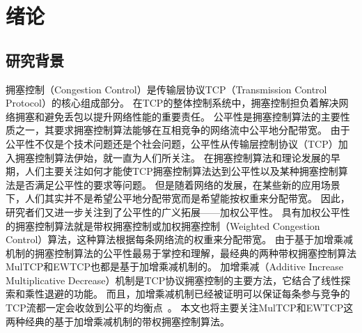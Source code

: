 \documentclass[winfonts]{njuthesis}
\begin{document}
\tableofcontents



\mainmatter

\chapter{绪论}\label{chapter:intro}
\section{研究背景}
拥塞控制（Congestion Control）是传输层协议TCP（Transmission Control Protocol）的核心组成部分。
在TCP的整体控制系统中，拥塞控制担负着解决网络拥塞和避免丢包以提升网络性能的重要责任\cite{jacobson1988congestion}。
公平性是拥塞控制算法的主要性质之一，其要求拥塞控制算法能够在互相竞争的网络流中公平地分配带宽。
由于公平性不仅是个技术问题还是个社会问题，公平性从传输层控制协议（TCP）加入拥塞控制算法伊始，就一直为人们所关注。
在拥塞控制算法和理论发展的早期，人们主要关注如何才能使TCP拥塞控制算法达到公平性以及某种拥塞控制算法是否满足公平性的要求等问题\cite{chiu1989analysis}\cite{kelly1998rate}\cite{hasegawa1999fairness}。
但是随着网络的发展，在某些新的应用场景\cite{wischik2011design}\cite{Nathan2019wcubic}下，人们其实并不是希望公平地分配带宽而是希望能按权重来分配带宽。
因此，研究者们又进一步关注到了公平性的广义拓展——加权公平性。
具有加权公平性的拥塞控制算法就是带权拥塞控制或加权拥塞控制（Weighted Congestion Control）算法，这种算法根据每条网络流的权重来分配带宽。
由于基于加增乘减机制的拥塞控制算法的公平性最易于掌控和理解，最经典的两种带权拥塞控制算法MulTCP\cite{crowcroft1998differentiated}和EWTCP\cite{wischik2011design}也都是基于加增乘减机制的。
加增乘减（Additive Increase Multiplicative Decrease）机制是TCP协议拥塞控制的主要方法，它结合了线性探索和乘性退避的功能。
而且，加增乘减机制已经被证明可以保证每条参与竞争的TCP流都一定会收敛到公平的均衡点~\cite{chiu1989analysis}。
本文也将主要关注MulTCP和EWTCP这两种经典的基于加增乘减机制的带权拥塞控制算法。
\end{document}
